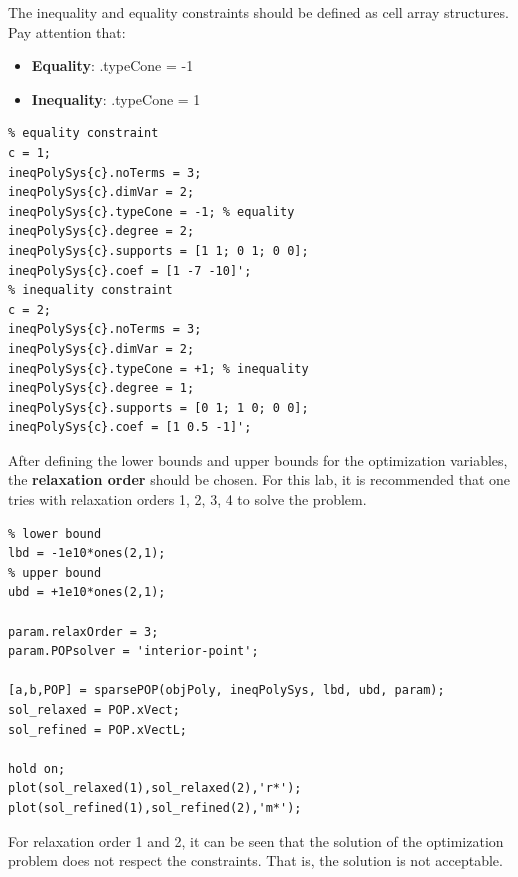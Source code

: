 The inequality and equality constraints should be defined as cell array structures. Pay attention that:
\begin{itemize}
\item \textbf{Equality}: .typeCone = -1
\item \textbf{Inequality}: .typeCone = 1
\end{itemize}

\begin{example}
\begin{lstlisting}
% equality constraint
c = 1;
ineqPolySys{c}.noTerms = 3;
ineqPolySys{c}.dimVar = 2;
ineqPolySys{c}.typeCone = -1; % equality
ineqPolySys{c}.degree = 2;
ineqPolySys{c}.supports = [1 1; 0 1; 0 0];
ineqPolySys{c}.coef = [1 -7 -10]';
% inequality constraint
c = 2;
ineqPolySys{c}.noTerms = 3;
ineqPolySys{c}.dimVar = 2;
ineqPolySys{c}.typeCone = +1; % inequality
ineqPolySys{c}.degree = 1;
ineqPolySys{c}.supports = [0 1; 1 0; 0 0];
ineqPolySys{c}.coef = [1 0.5 -1]';
\end{lstlisting}
\end{example}

After defining the lower bounds and upper bounds for the optimization variables, the \textbf{relaxation order} should be chosen. For this lab, it is recommended that one tries with relaxation orders 1, 2, 3, 4 to solve the problem.

\begin{example}
\begin{lstlisting}
% lower bound
lbd = -1e10*ones(2,1);
% upper bound
ubd = +1e10*ones(2,1);

param.relaxOrder = 3;
param.POPsolver = 'interior-point';

[a,b,POP] = sparsePOP(objPoly, ineqPolySys, lbd, ubd, param);
sol_relaxed = POP.xVect;
sol_refined = POP.xVectL;

hold on; 
plot(sol_relaxed(1),sol_relaxed(2),'r*');
plot(sol_refined(1),sol_refined(2),'m*');
\end{lstlisting}
\end{example}

For relaxation order 1 and 2, it can be seen that the solution of the optimization problem does not respect the constraints. That is, the solution is not acceptable.

